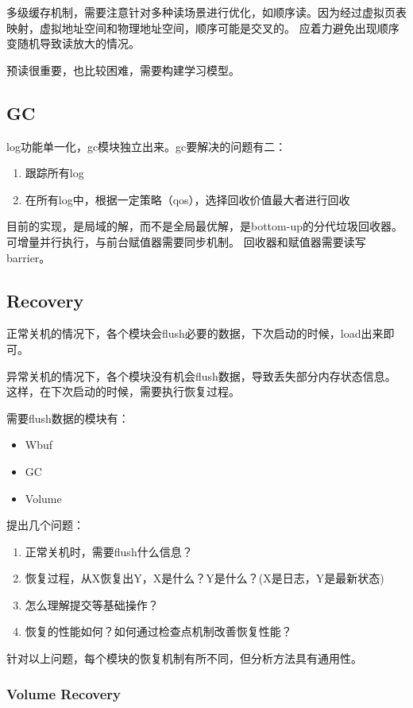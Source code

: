 \documentclass[UTF8]{ctexart}
\begin{document}
多级缓存机制，需要注意针对多种读场景进行优化，如顺序读。因为经过虚拟页表映射，虚拟地址空间和物理地址空间，顺序可能是交叉的。
应着力避免出现顺序变随机导致读放大的情况。

预读很重要，也比较困难，需要构建学习模型。

\subsection{GC}

log功能单一化，gc模块独立出来。gc要解决的问题有二：
\begin{enumerate}
    \item 跟踪所有log
    \item 在所有log中，根据一定策略（qos），选择回收价值最大者进行回收
\end{enumerate}

目前的实现，是局域的解，而不是全局最优解，是bottom-up的分代垃圾回收器。可增量并行执行，与前台赋值器需要同步机制。
回收器和赋值器需要读写barrier。

\subsection{Recovery}

正常关机的情况下，各个模块会flush必要的数据，下次启动的时候，load出来即可。

异常关机的情况下，各个模块没有机会flush数据，导致丢失部分内存状态信息。
这样，在下次启动的时候，需要执行恢复过程。

需要flush数据的模块有：
\begin{itemize}
    \item Wbuf
    \item GC
    \item Volume
\end{itemize}

提出几个问题：
\begin{enumerate}
    \item 正常关机时，需要flush什么信息？
    \item 恢复过程，从X恢复出Y，X是什么？Y是什么？(X是日志，Y是最新状态)
    \item 怎么理解提交等基础操作？
    \item 恢复的性能如何？如何通过检查点机制改善恢复性能？
\end{enumerate}

针对以上问题，每个模块的恢复机制有所不同，但分析方法具有通用性。

\subsubsection{Volume Recovery}
\end{document}
